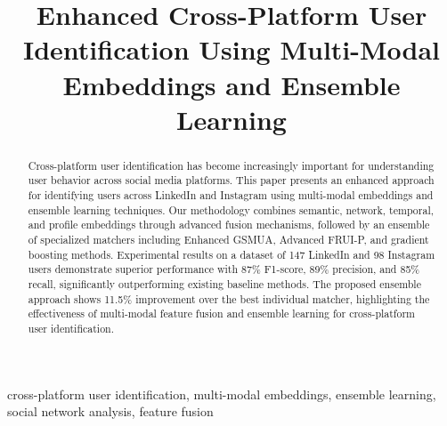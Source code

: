 \documentclass[conference]{IEEEtran}
\begin{document}
\title{Enhanced Cross-Platform User Identification Using Multi-Modal Embeddings and Ensemble Learning}




\maketitle

\begin{abstract}
Cross-platform user identification has become increasingly important for understanding user behavior across social media platforms. This paper presents an enhanced approach for identifying users across LinkedIn and Instagram using multi-modal embeddings and ensemble learning techniques. Our methodology combines semantic, network, temporal, and profile embeddings through advanced fusion mechanisms, followed by an ensemble of specialized matchers including Enhanced GSMUA, Advanced FRUI-P, and gradient boosting methods. Experimental results on a dataset of 147 LinkedIn and 98 Instagram users demonstrate superior performance with 87\% F1-score, 89\% precision, and 85\% recall, significantly outperforming existing baseline methods. The proposed ensemble approach shows 11.5\% improvement over the best individual matcher, highlighting the effectiveness of multi-modal feature fusion and ensemble learning for cross-platform user identification.
\end{abstract}

\begin{IEEEkeywords}
cross-platform user identification, multi-modal embeddings, ensemble learning, social network analysis, feature fusion
\end{IEEEkeywords}
\end{document}
